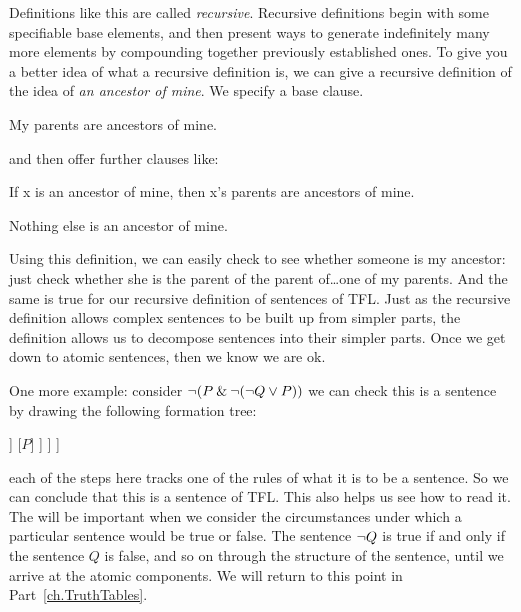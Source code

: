 Definitions like this are called \emph{recursive}. Recursive definitions begin with some specifiable base elements, and then present ways to generate indefinitely many more elements by compounding together previously established ones. To give you a better idea of what a recursive definition is, we can give a recursive definition of the idea of \emph{an ancestor of mine}. We specify a base clause.
	\begin{ebullet}
		\item My parents are ancestors of mine.
	\end{ebullet}
and then offer further clauses like:
	\begin{ebullet}
		\item If x is an ancestor of mine, then x's parents are ancestors of mine.
		\item Nothing else is an ancestor of mine.
	\end{ebullet}
Using this definition, we can easily check to see whether someone is my ancestor: just check whether she is the parent of the parent of\ldots one of my parents. And the same is true for our recursive definition of sentences of TFL. Just as the recursive definition allows complex sentences to be built up from simpler parts, the definition allows us to decompose sentences into their simpler parts. Once we get down to atomic sentences, then we know we are ok. 



One more example: consider $\neg (P \mathbin{\&} \neg (\neg Q \vee P))$ we can check this is a sentence by drawing the following formation tree:
\label{S:formationtree}
\begin{center}
\begin{forest}
	[$\mainconnective{\enot}\,  (P \eand \enot (\enot Q \eor P))$
		[$(P \,\mainconnective{\eand}\,  \enot (\enot Q \eor P))$
			[$P$]
			[$\mainconnective{\enot}\,   (\enot Q\eor P)$
				[$\mainconnective{\enot}\,   Q$
					[$Q$]
				]
				[$P$]
			]
		]
	]
\end{forest}
\end{center}
each of the steps here tracks one of the rules of what it is to be a sentence. So we can conclude that this is a sentence of TFL. This also helps us see how to read it.
The will be important when we consider the circumstances under which a particular sentence would be true or false. The sentence $\neg Q$ is true if and only if the sentence $Q$ is false, and so on through the structure of the sentence, until we arrive at the atomic components. We will return to this point in Part~\ref{ch.TruthTables}.

